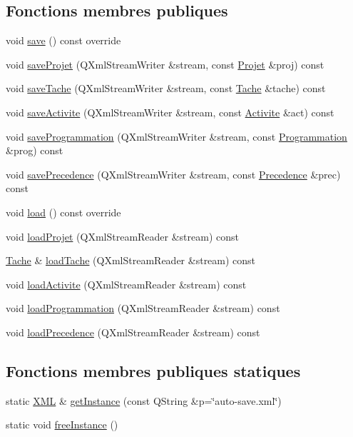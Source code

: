 \subsection*{Fonctions membres publiques}
\begin{DoxyCompactItemize}
\item 
void \hyperlink{class_x_m_l_a0c2f3b489419670e42e6cb3b5a99d685}{save} () const override
\item 
void \hyperlink{class_x_m_l_a4d293b9b95938449b0eb789cc93d9b50}{save\+Projet} (Q\+Xml\+Stream\+Writer \&stream, const \hyperlink{class_projet}{Projet} \&proj) const 
\item 
void \hyperlink{class_x_m_l_acd2ed06f43002937540f02db3edd5119}{save\+Tache} (Q\+Xml\+Stream\+Writer \&stream, const \hyperlink{class_tache}{Tache} \&tache) const 
\item 
void \hyperlink{class_x_m_l_acedd44046fabe1b5e92a67d5a92bc577}{save\+Activite} (Q\+Xml\+Stream\+Writer \&stream, const \hyperlink{class_activite}{Activite} \&act) const 
\item 
void \hyperlink{class_x_m_l_a954c040930e567a46c2390f0188f273d}{save\+Programmation} (Q\+Xml\+Stream\+Writer \&stream, const \hyperlink{class_programmation}{Programmation} \&prog) const 
\item 
void \hyperlink{class_x_m_l_ad0ece286ff5262a63e68e08e2878b0c8}{save\+Precedence} (Q\+Xml\+Stream\+Writer \&stream, const \hyperlink{class_precedence}{Precedence} \&prec) const 
\item 
void \hyperlink{class_x_m_l_aba46159218c520cdc783654b34a2c0dd}{load} () const override
\item 
void \hyperlink{class_x_m_l_a67683ccfd45dcc4aa18317fefcf723fd}{load\+Projet} (Q\+Xml\+Stream\+Reader \&stream) const 
\item 
\hyperlink{class_tache}{Tache} \& \hyperlink{class_x_m_l_a0b5ebfcd1601f9353d9d13f8290e7319}{load\+Tache} (Q\+Xml\+Stream\+Reader \&stream) const 
\item 
void \hyperlink{class_x_m_l_a554eb55c0c69dbc3045615d0ab68ab1d}{load\+Activite} (Q\+Xml\+Stream\+Reader \&stream) const 
\item 
void \hyperlink{class_x_m_l_a0f2858b84a734c0238d4478df89ce170}{load\+Programmation} (Q\+Xml\+Stream\+Reader \&stream) const 
\item 
void \hyperlink{class_x_m_l_a0593dfc3350675f6da3098ac68bb060d}{load\+Precedence} (Q\+Xml\+Stream\+Reader \&stream) const 
\end{DoxyCompactItemize}
\subsection*{Fonctions membres publiques statiques}
\begin{DoxyCompactItemize}
\item 
static \hyperlink{class_x_m_l}{X\+M\+L} \& \hyperlink{class_x_m_l_aa2d6c4ab68ae45a0cbb71d3baa67a119}{get\+Instance} (const Q\+String \&p=\char`\"{}auto-\/save.\+xml\char`\"{})
\item 
static void \hyperlink{class_x_m_l_aa636b752f30ee85554a88b29687deed7}{free\+Instance} ()
\end{DoxyCompactItemize}
